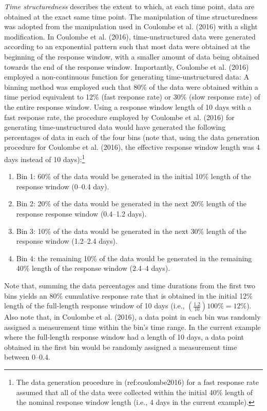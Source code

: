 \documentclass[
12pt, %
twoside,
english]{guelphthesis}
\theoremstyle{definition}
\theoremstyle{definition}
\theoremstyle{definition}
\theoremstyle{definition}
\theoremstyle{remark}
\begin{document}
\emph{Time structuredness} describes the extent to which, at each time point, data are obtained at the exact same time point. The manipulation of time structuredness was adopted from the manipulation used in Coulombe et al. (2016) with a slight modification. In Coulombe et al. (2016), time-unstructured data were generated according to an exponential pattern such that most data were obtained at the beginning of the response window, with a smaller amount of data being obtained towards the end of the response window. Importantly, Coulombe et al. (2016) employed a non-continuous function for generating time-unstructured data: A binning method was employed such that 80\% of the data were obtained within a time period equivalent to 12\% (fast response rate) or 30\% (slow response rate) of the entire response window. Using a response window length of 10 days with a fast response rate, the procedure employed by Coulombe et al. (2016) for generating time-unstructured data would have generated the following percentages of data in each of the four bins (note that, using the data generation procedure for Coulombe et al. (2016), the effective response window length was 4 days instead of 10 days):\footnote{The data generation procedure in (ref:coulombe2016) for a fast response rate assumed that all of the data were collected within the initial 40\% length of the nominal response window length (i.e., 4 days in the current example).}
\begin{enumerate}
\def\labelenumi{\arabic{enumi})}
\tightlist
\item
  Bin 1: 60\% of the data would be generated in the initial 10\% length of the response window (0--0.4 day).
\item
  Bin 2: 20\% of the data would be generated in the next 20\% length of the response response window (0.4--1.2 days).
\item
  Bin 3: 10\% of the data would be generated in the next 30\% length of the response window (1.2--2.4 days).
\item
  Bin 4: the remaining 10\% of the data would be generated in the remaining 40\% length of the response window (2.4--4 days).
\end{enumerate}
\noindent Note that, summing the data percentages and time durations from the first two bins yields an 80\% cumulative response rate that is obtained in the initial 12\% length of the full-length response window of 10 days (i.e., \((\frac{1.2}{10})100\% = 12\%\)). Also note that, in Coulombe et al. (2016), a data point in each bin was randomly assigned a measurement time within the bin's time range. In the current example where the full-length response window had a length of 10 days, a data point obtained in the first bin would be randomly assigned a measurement time between 0--0.4.
\end{document}
